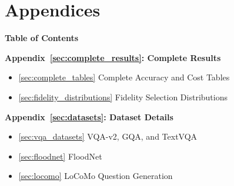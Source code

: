 \documentclass[11pt]{article}
\theoremstyle{plain}
\theoremstyle{definition}
\theoremstyle{remark}
\begin{document}








\newpage
\onecolumn
\appendix

\section*{Appendices}

\renewcommand{\thesubsection}{\Alph{section}.\arabic{subsection}}

\begin{center}
\textbf{\Large Table of Contents}
\end{center}

\vspace{1em}

\noindent\textbf{Appendix~\ref{sec:complete_results}: Complete Results} \dotfill \pageref{sec:complete_results}
\begin{itemize}[leftmargin=2em, label={}]
    \item \ref{sec:complete_tables} Complete Accuracy and Cost Tables \dotfill \pageref{sec:complete_tables}
    \item \ref{sec:fidelity_distributions} Fidelity Selection Distributions \dotfill \pageref{sec:fidelity_distributions}
\end{itemize}

\vspace{0.5em}

\noindent\textbf{Appendix~\ref{sec:datasets}: Dataset Details} \dotfill \pageref{sec:datasets}
\begin{itemize}[leftmargin=2em, label={}]
    \item \ref{sec:vqa_datasets} VQA-v2, GQA, and TextVQA \dotfill \pageref{sec:vqa_datasets}
    \item \ref{sec:floodnet} FloodNet \dotfill \pageref{sec:floodnet}
    \item \ref{sec:locomo} LoCoMo Question Generation \dotfill \pageref{sec:locomo}
\end{itemize}
\end{document}
